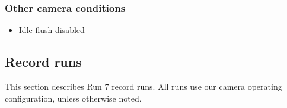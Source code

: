 \subsubsection{Other camera conditions}\label{other-camera-conditions}

\begin{itemize}
\tightlist
\item
  Idle flush disabled
\end{itemize}

\subsection{Record runs}\label{record-runs} 

This section describes Run 7 record runs. All runs use our camera operating configuration, unless otherwise noted.

